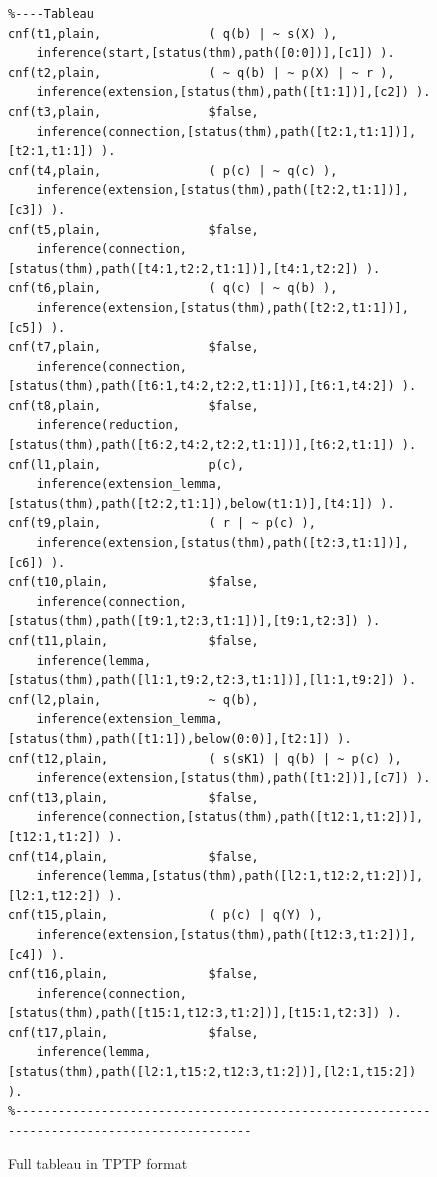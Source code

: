 \documentclass[runningheads]{llncs}
\begin{document}
\begin{figure}[htb]
{{\begin{verbatim}
%----Tableau
cnf(t1,plain,               ( q(b) | ~ s(X) ),
    inference(start,[status(thm),path([0:0])],[c1]) ).
cnf(t2,plain,               ( ~ q(b) | ~ p(X) | ~ r ),
    inference(extension,[status(thm),path([t1:1])],[c2]) ).
cnf(t3,plain,               $false,
    inference(connection,[status(thm),path([t2:1,t1:1])],[t2:1,t1:1]) ).
cnf(t4,plain,               ( p(c) | ~ q(c) ),
    inference(extension,[status(thm),path([t2:2,t1:1])],[c3]) ).
cnf(t5,plain,               $false,
    inference(connection,[status(thm),path([t4:1,t2:2,t1:1])],[t4:1,t2:2]) ).
cnf(t6,plain,               ( q(c) | ~ q(b) ),
    inference(extension,[status(thm),path([t2:2,t1:1])],[c5]) ).
cnf(t7,plain,               $false,
    inference(connection,[status(thm),path([t6:1,t4:2,t2:2,t1:1])],[t6:1,t4:2]) ).
cnf(t8,plain,               $false,
    inference(reduction,[status(thm),path([t6:2,t4:2,t2:2,t1:1])],[t6:2,t1:1]) ).
cnf(l1,plain,               p(c),
    inference(extension_lemma,[status(thm),path([t2:2,t1:1]),below(t1:1)],[t4:1]) ).
cnf(t9,plain,               ( r | ~ p(c) ),
    inference(extension,[status(thm),path([t2:3,t1:1])],[c6]) ).
cnf(t10,plain,              $false,
    inference(connection,[status(thm),path([t9:1,t2:3,t1:1])],[t9:1,t2:3]) ).
cnf(t11,plain,              $false,
    inference(lemma,[status(thm),path([l1:1,t9:2,t2:3,t1:1])],[l1:1,t9:2]) ).
cnf(l2,plain,               ~ q(b),
    inference(extension_lemma,[status(thm),path([t1:1]),below(0:0)],[t2:1]) ).
cnf(t12,plain,              ( s(sK1) | q(b) | ~ p(c) ),
    inference(extension,[status(thm),path([t1:2])],[c7]) ).
cnf(t13,plain,              $false,
    inference(connection,[status(thm),path([t12:1,t1:2])],[t12:1,t1:2]) ).
cnf(t14,plain,              $false,
    inference(lemma,[status(thm),path([l2:1,t12:2,t1:2])],[l2:1,t12:2]) ).
cnf(t15,plain,              ( p(c) | q(Y) ),
    inference(extension,[status(thm),path([t12:3,t1:2])],[c4]) ).
cnf(t16,plain,              $false,
    inference(connection,[status(thm),path([t15:1,t12:3,t1:2])],[t15:1,t2:3]) ).
cnf(t17,plain,              $false,
    inference(lemma,[status(thm),path([l2:1,t15:2,t12:3,t1:2])],[l2:1,t15:2]) ).
%--------------------------------------------------------------------------------------------
\end{verbatim}
}}
\caption{Full tableau in TPTP format}
\label{FullTableauCode}
\end{figure}

\end{document}
